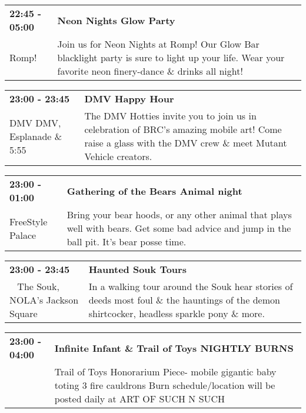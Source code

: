 \begin{tabular}{ p{1in} p{2.2in} }
    \textbf{22:45 - 05:00} & \textbf{Neon Nights Glow Party} \\
    Romp! \newline  & Join us for Neon Nights at Romp! Our Glow Bar blacklight party is sure to light up your life. Wear your favorite neon finery-dance \& drinks all night! \\
    \hline 
\end{tabular}
    
\begin{tabular}{ p{1in} p{2.2in} }
    \textbf{23:00 - 23:45} & \textbf{DMV Happy Hour} \\
    DMV \newline DMV, Esplanade \& 5:55 & The DMV Hotties invite you to join us in celebration of BRC's amazing mobile art! Come raise a glass with the DMV crew \& meet Mutant Vehicle creators. \\
    \hline 
\end{tabular}
    
\begin{tabular}{ p{1in} p{2.2in} }
    \textbf{23:00 - 01:00} & \textbf{Gathering of the Bears Animal night} \\
    FreeStyle Palace \newline  & Bring your bear hoods, or any other animal that plays well with bears.  Get some bad advice and jump in the ball pit. It's bear posse time. \\
    \hline 
\end{tabular}
    
\begin{tabular}{ p{1in} p{2.2in} }
    \textbf{23:00 - 23:45} & \textbf{Haunted Souk Tours} \\
    ~ \newline The Souk, NOLA's Jackson Square & In a walking tour around the Souk hear stories of deeds most foul \& the hauntings of the demon shirtcocker, headless sparkle pony \& more. \\
    \hline 
\end{tabular}
    
\begin{tabular}{ p{1in} p{2.2in} }
    \textbf{23:00 - 04:00} & \textbf{Infinite Infant \& Trail of Toys NIGHTLY BURNS} \\
    ~ \newline  & Trail of Toys Honorarium Piece- mobile gigantic baby toting 3 fire cauldrons Burn schedule/location will be posted daily at ART OF SUCH N SUCH \\
    \hline 
\end{tabular}
    
